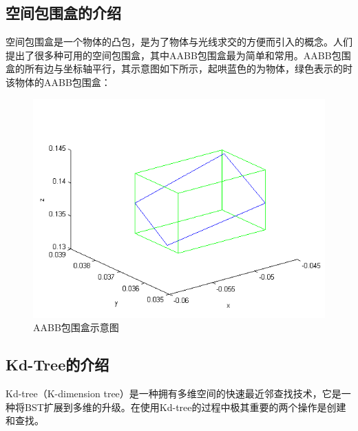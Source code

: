 \documentclass[10pt]{article}
\begin{document}
\subsection{空间包围盒的介绍}
空间包围盒是一个物体的凸包，是为了物体与光线求交的方便而引入的概念。人们提出了很多种可用的空间包围盒，其中AABB包围盒最为简单和常用。AABB包围盒的所有边与坐标轴平行，其示意图如下所示，起哄蓝色的为物体，绿色表示的时该物体的AABB包围盒：
\begin{figure}[H]
\begin{center}
\includegraphics[scale=0.5]{AABB1.png}
\caption{AABB包围盒示意图}
\end{center}
\end{figure}
\subsection{Kd-Tree的介绍}
Kd-tree（K-dimension tree）是一种拥有多维空间的快速最近邻查找技术，它是一种将BST扩展到多维的升级。在使用Kd-tree的过程中极其重要的两个操作是创建和查找。
\end{document}

